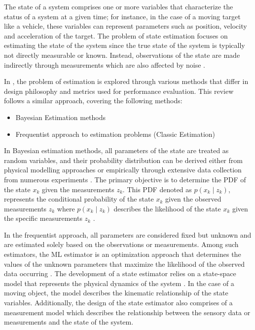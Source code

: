 The state of a system comprises one or more variables that characterize the status of a system at a given time; for instance, in the case of a moving target like a vehicle, these variables can represent parameters such as position, velocity and acceleration of the target. The problem of state estimation focuses on estimating the state of the system since the true state of the system is typically not directly measurable or known. Instead, observations of the state are made indirectly through measurements which are also affected by noise \cite{Dunik2020}.

In \cite{Levy2008}, the problem of estimation is explored through various methods that differ in design philosophy and metrics used for performance evaluation. This review follows a similar approach, covering the following methods:
\begin{itemize}
    \item Bayesian Estimation methods
    \item Frequentist approach to estimation problems (Classic Estimation)
\end{itemize}
In  Bayesian estimation methods, all parameters of the state are treated as random variables, and their probability distribution can be derived either from physical modelling approaches or empirically through extensive data collection from numerous experiments \cite{Levy2008}. The primary objective is to determine the \ac{PDF} of the state $x_k$ given the measurements $z_k$. This \ac{PDF} denoted as $p(x_k \mid z_k)$, represents the conditional probability of the state $x_k$ given the observed measurements $z_k$ where $p(x_k \mid z_k)$ describes the likelihood of the state $x_k$ given the specific measurements $z_k$ \cite{Dunik2020}.

In the frequentist approach, all parameters are considered fixed but unknown and are estimated solely based on the observations or measurements. Among such estimators, the \ac{ML} estimator is an optimization approach that determines the values of the unknown parameters that maximize the likelihood of the observed data occurring \cite{Levy2008}. The development of a state estimator relies on a state-space model that represents the physical dynamics of the system \cite{Hasdiana2018}. In the case of a moving object, the model describes the kinematic relationship of the state variables. Additionally, the design of the state estimator also comprises of a measurement model which describes the relationship between the sensory data or measurements and the state of the system. 

